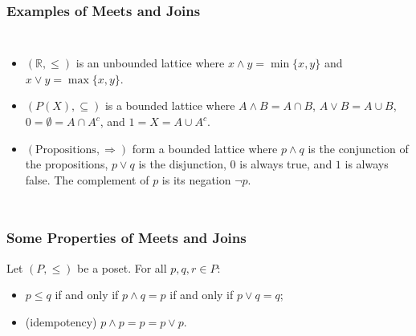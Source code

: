 \documentclass{beamer}
\begin{document}
\begin{frame}

	\frametitle{Examples of Meets and Joins}
	
	\begin{example}
		
		\begin{columns}

			\begin{itemize}
		
				\item $(\mathbb{R},\leq)$ is an unbounded lattice where $x\wedge y=\min\{x,y\}$ and $x\vee y=\max\{x,y\}$.
		
				\item $(P(X),\subseteq)$ is a bounded lattice where $A\wedge B=A\cap B$, $A\vee B=A\cup B$, $0=\emptyset=A\cap A^c$, and $1=X=A\cup A^c$.
			
				\item $(\text{Propositions},\Rightarrow)$ form a bounded lattice where $p\wedge q$ is the conjunction of the propositions, $p\vee q$ is the disjunction, $0$ is always true, and $1$ is always false. The complement of $p$ is its negation $\neg p$.
		
			\end{itemize}	
			
			
	
		\end{columns}	
		
	\end{example}

\end{frame}

\begin{frame}

	\frametitle{Some Properties of Meets and Joins}
	
	\begin{theorem}
	
		Let $(P,\leq)$ be a poset. For all $p,q,r\in P$:
		\begin{itemize}
			\item $p\leq q$ if and only if $p\wedge q = p$ if and only if $p\vee q=q$;
			\item (idempotency) $p\wedge p=p=p\vee p$.
		\end{itemize}			
	
	\end{theorem}

\end{frame}
\end{document}
